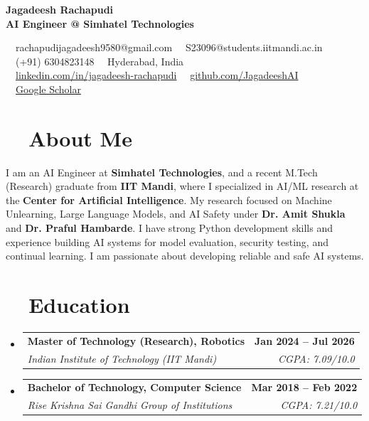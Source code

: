 \documentclass[a4paper,11pt]{article}
\makeatletter
\newcommand{\resumeSubheading}[4]{
  \vspace{-2pt}\item
    \begin{tabular*}{0.97\textwidth}[t]{l@{\extracolsep{\fill}}r}
      \textbf{#1} & \textbf{#2} \\
      \textit{\small#3} & \textit{\small #4} \\
    \end{tabular*}\vspace{-7pt}
}
\newcommand{\resumeSubHeadingListStart}{\begin{itemize}[leftmargin=0.15in, label={}]}
\newcommand{\resumeSubHeadingListEnd}{\end{itemize}}
\makeatother
\begin{document}
\begin{center}
    \textbf{\Huge Jagadeesh Rachapudi} \\
    \vspace{5pt}
    \textbf{\large AI Engineer @ Simhatel Technologies}
    \vspace{8pt}

    \faEnvelope\ \ rachapudijagadeesh9580@gmail.com \quad
    \faEnvelope\ \ S23096@students.iitmandi.ac.in \\
    \faPhone\ \ (+91) 6304823148 \quad
    \faMapMarker\ \ Hyderabad, India \\
    \faLinkedin\ \ \href{https://www.linkedin.com/in/jagadeesh-rachapudi-49969a188/}{linkedin.com/in/jagadeesh-rachapudi} \quad
    \faGithub\ \ \href{https://github.com/JagadeeshAI}{github.com/JagadeeshAI} \\
    \faGoogle\ \ \href{https://scholar.google.com/citations?user=ljXq970AAAAJ\&hl=en}{Google Scholar}
\end{center}
\vspace{5pt}

\section{\faPen\ \ About Me}
\vspace{0.25cm}
I am an AI Engineer at \textbf{Simhatel Technologies}, and a recent M.Tech (Research) graduate from \textbf{IIT Mandi}, where I specialized in AI/ML research at the \textbf{Center for Artificial Intelligence}. My research focused on Machine Unlearning, Large Language Models, and AI Safety under \textbf{Dr. Amit Shukla} and \textbf{Dr. Praful Hambarde}. I have strong Python development skills and experience building AI systems for model evaluation, security testing, and continual learning. I am passionate about developing reliable and safe AI systems.

\vspace{0.25cm}
\section{\faGraduationCap\ \ Education}
  \resumeSubHeadingListStart
  \vspace{0.25cm}
    \resumeSubheading
      {Master of Technology (Research), Robotics}{Jan 2024 -- Jul 2026}
      {Indian Institute of Technology (IIT Mandi)}{CGPA: 7.09/10.0}
    \resumeSubheading
      {Bachelor of Technology, Computer Science}{Mar 2018 -- Feb 2022}
      {Rise Krishna Sai Gandhi Group of Institutions}{CGPA: 7.21/10.0}
  \resumeSubHeadingListEnd
\end{document}
